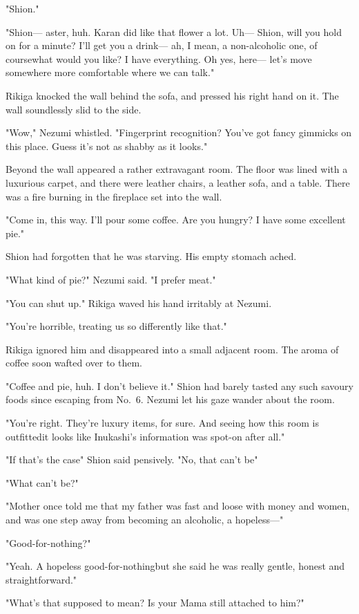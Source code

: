 "Shion."

"Shion--- aster, huh. Karan did like that flower a lot. Uh--- Shion, will
you hold on for a minute? I'll get you a drink--- ah, I mean, a
non-alcoholic one, of course\el what would you like? I have everything.
Oh yes, here--- let's move somewhere more comfortable where we can talk."

Rikiga knocked the wall behind the sofa, and pressed his right hand on
it. The wall soundlessly slid to the side.

"Wow," Nezumi whistled. "Fingerprint recognition? You've got fancy
gimmicks on this place. Guess it's not as shabby as it looks."

Beyond the wall appeared a rather extravagant room. The floor was lined
with a luxurious carpet, and there were leather chairs, a leather sofa,
and a table. There was a fire burning in the fireplace set into the
wall.

"Come in, this way. I'll pour some coffee. Are you hungry? I have some
excellent pie."

Shion had forgotten that he was starving. His empty stomach ached.

"What kind of pie?" Nezumi said. "I prefer meat."

"You can shut up." Rikiga waved his hand irritably at Nezumi.

"You're horrible, treating us so differently like that."

Rikiga ignored him and disappeared into a small adjacent room. The aroma
of coffee soon wafted over to them.

"Coffee and pie, huh. I don't believe it." Shion had barely tasted any
such savoury foods since escaping from No.~6. Nezumi let his gaze wander
about the room.

"You're right. They're luxury items, for sure. And seeing how this room
is outfitted\el it looks like Inukashi's information was spot-on after
all."

"If that's the case\el " Shion said pensively. "No, that can't be\el "

"What can't be?"

"Mother once told me that my father was fast and loose with money and
women, and was one step away from becoming an alcoholic, a hopeless---"

"Good-for-nothing?"

"Yeah. A hopeless good-for-nothing\el but she said he was really gentle,
honest and straightforward."

"What's that supposed to mean? Is your Mama still attached to him?"


